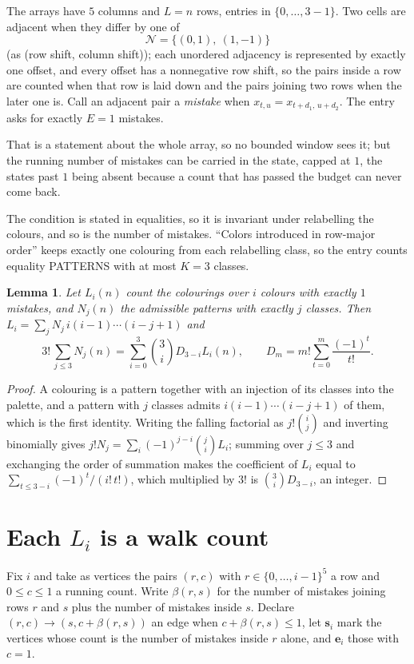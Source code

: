 \documentclass[11pt,a4paper]{article}
\theoremstyle{plain}
\newtheorem{lemma}[theorem]{Lemma}
\theoremstyle{definition}
\begin{document}
The arrays have $5$ columns and $L=n$ rows, entries in $\{0,\dots,3-1\}$.
Two cells are adjacent when they differ by one of
\[
\mathcal N=\{(0,1),\ (1,-1)\}
\]
(as (row shift, column shift)); each unordered adjacency is represented by exactly one
offset, and every offset has a nonnegative row shift, so the pairs inside a row are
counted when that row is laid down and the pairs joining two rows when the later one
is. Call an adjacent pair a \emph{mistake} when $x_{t,u}=x_{t+d_1,\,u+d_2}$. The entry asks for exactly
$E=1$ mistakes.

That is a statement about the whole array, so no bounded window sees it; but the running
number of mistakes can be carried in the state, capped at $1$, the states past $1$ being
absent because a count that has passed the budget can never come back.

The condition is stated in equalities, so it is invariant under relabelling the colours, and
so is the number of mistakes. ``Colors introduced in row-major order'' keeps exactly one
colouring from each relabelling class, so the entry counts equality PATTERNS with at most
$K=3$ classes.

\begin{lemma}\label{lem:inv}
Let $L_i(n)$ count the colourings over $i$ colours with exactly $1$ mistakes, and $N_j(n)$
the admissible patterns with exactly $j$ classes. Then
$L_i=\sum_j N_j\,i(i-1)\cdots(i-j+1)$ and
\[
3!\,\sum_{j\le3}N_j(n)=\sum_{i=0}^{3}\binom{3}{i}D_{3-i}L_i(n),
\qquad D_m=m!\sum_{t=0}^{m}\frac{(-1)^t}{t!} .
\]
\end{lemma}

\begin{proof}
A colouring is a pattern together with an injection of its classes into the palette, and a
pattern with $j$ classes admits $i(i-1)\cdots(i-j+1)$ of them, which is the first identity.
Writing the falling factorial as $j!\binom{i}{j}$ and inverting binomially gives
$j!N_j=\sum_i(-1)^{j-i}\binom{j}{i}L_i$; summing over $j\le3$ and exchanging the order
of summation makes the coefficient of $L_i$ equal to $\sum_{t\le3-i}(-1)^t/(i!\,t!)$,
which multiplied by $3!$ is $\binom{3}{i}D_{3-i}$, an integer.
\end{proof}

\section{Each $L_i$ is a walk count}

Fix $i$ and take as vertices the pairs $(r,c)$ with $r\in\{0,\dots,i-1\}^{5}$ a row
and $0\le c\le1$ a running count. Write $\beta(r,s)$ for the number of mistakes joining
rows $r$ and $s$ plus the number of mistakes inside $s$. Declare $(r,c)\to(s,c+\beta(r,s))$
an edge when $c+\beta(r,s)\le1$, let $\mathbf{s}_i$ mark the vertices whose count is the
number of mistakes inside $r$ alone, and $\mathbf{e}_i$ those with $c=1$.
\end{document}
